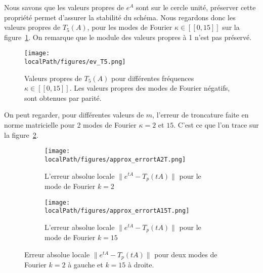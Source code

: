 Nous savons que les valeurs propres de $e^{A}$ sont sur le cercle unité, préserver cette propriété permet d'assurer la stabilité du schéma. Nous regardons donc les valeurs propres de $T_5(A)$, pour les modes de Fourier $\kappa\in[\![0,15]\!]$ sur la figure~\ref{fig:ev:T5}. On remarque que le module des valeurs propres à 1 n'est pas préservé.

\begin{figure}
  \centering
  \texttt{[image: \\localPath/figures/ev\_T5.png]}
  \caption{Valeurs propres de $T_5(A)$ pour différentes fréquences $\kappa\in[\![0,15]\!]$. Les valeurs propres des modes de Fourier négatifs, sont obtenues par parité.}
  \label{fig:ev:T5}
\end{figure}

On peut regarder, pour différentes valeurs de $m$, l'erreur de troncature faite en norme matricielle pour 2 modes de Fourier $\kappa=2$ et $15$. C'est ce que l'on trace sur la figure~\ref{fig:taylor:error}.


\begin{figure}
  \begin{subfigure}{.5\textwidth}
    \centering
    \texttt{[image: \\localPath/figures/approx\_errortA2T.png]}
    \caption{L'erreur absolue locale $\|e^{tA}-T_p(tA)\|$ pour le mode de Fourier $k=2$}
  \end{subfigure}
  \begin{subfigure}{.5\textwidth}
    \centering
    \texttt{[image: \\localPath/figures/approx\_errortA15T.png]}
    \caption{L'erreur absolue locale $\|e^{tA}-T_p(tA)\|$ pour le mode de Fourier $k=15$}
  \end{subfigure}
  \caption{Erreur absolue locale $\|e^{tA}-T_p(tA)\|$ pour deux modes de Fourier $k=2$ à gauche et $k=15$ à droite.}
  \label{fig:taylor:error}
\end{figure}

